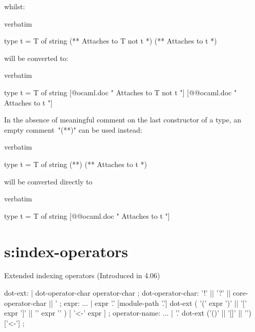 {whilst:

\begin{camlexample}{verbatim}
\begin{caml}
\begin{camlinput}
type t = T of string
(** Attaches to T not t *)
(** Attaches to t *)
\end{camlinput}
\end{caml}
\end{camlexample}

will be converted to:

\begin{camlexample}{verbatim}
\begin{caml}
\begin{camlinput}
type t =  T of string [@ocaml.doc " Attaches to T not t "]
[@@ocaml.doc " Attaches to t "]
\end{camlinput}
\end{caml}
\end{camlexample}

In the absence of meaningful comment on the last constructor of
a type, an empty comment~"(**)" can be used instead:

\begin{camlexample}{verbatim}
\begin{caml}
\begin{camlinput}
type t = T of string
(**)
(** Attaches to t *)
\end{camlinput}
\end{caml}
\end{camlexample}

will be converted directly to

\begin{camlexample}{verbatim}
\begin{caml}
\begin{camlinput}
type t =  T of string
[@@ocaml.doc " Attaches to t "]
\end{camlinput}
\end{caml}
\end{camlexample}

\section{s:index-operators}{Extended indexing operators }
(Introduced in 4.06)

\begin{syntax}

dot-ext:
   | dot-operator-char { operator-char }
;
dot-operator-char:
  '!' ||  '?' || core-operator-char || '%
;
expr:
          ...
        | expr '.' [module-path '.'] dot-ext ( '(' expr ')' || '[' expr ']' || '{' expr '}' ) [ '<-' expr ]
;
operator-name:
          ...
        | '.' dot-ext ('()' || '[]' || '{}') ['<-']
;
\end{syntax}


}
